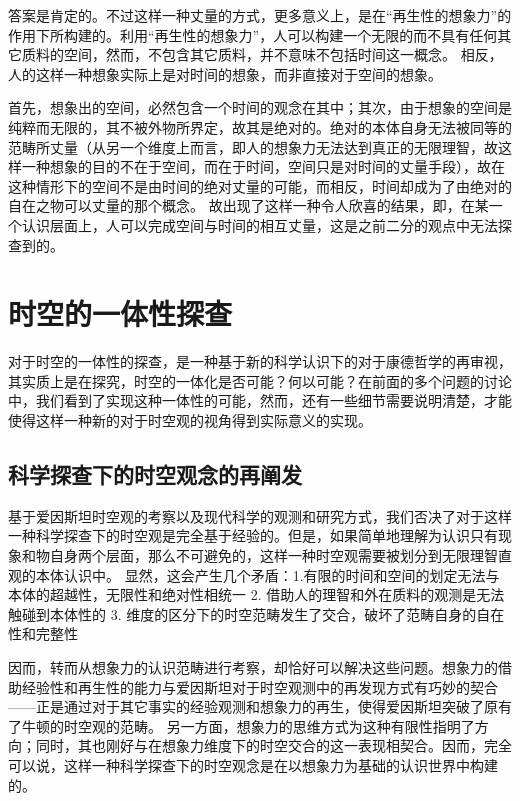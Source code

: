 \documentclass[lang=cn,11pt]{elegantpaper}
\begin{document}
答案是肯定的。不过这样一种丈量的方式，更多意义上，是在“再生性的想象力”的作用下所构建的。利用“再生性的想象力”，人可以构建一个无限的而不具有任何其它质料的空间，然而，不包含其它质料，并不意味不包括时间这一概念。
相反，人的这样一种想象实际上是对时间的想象，而非直接对于空间的想象。

首先，想象出的空间，必然包含一个时间的观念在其中；其次，由于想象的空间是纯粹而无限的，其不被外物所界定，故其是绝对的。绝对的本体自身无法被同等的范畴所丈量（从另一个维度上而言，即人的想象力无法达到真正的无限理智，故这样一种想象的目的不在于空间，而在于时间，空间只是对时间的丈量手段），故在这种情形下的空间不是由时间的绝对丈量的可能，而相反，时间却成为了由绝对的自在之物可以丈量的那个概念。
故出现了这样一种令人欣喜的结果，即，在某一个认识层面上，人可以完成空间与时间的相互丈量，这是之前二分的观点中无法探查到的。
\section{时空的一体性探查}
对于时空的一体性的探查，是一种基于新的科学认识下的对于康德哲学的再审视，其实质上是在探究，时空的一体化是否可能？何以可能？在前面的多个问题的讨论中，我们看到了实现这种一体性的可能，然而，还有一些细节需要说明清楚，才能使得这样一种新的对于时空观的视角得到实际意义的实现。
\subsection{科学探查下的时空观念的再阐发}
基于爱因斯坦时空观的考察以及现代科学的观测和研究方式，我们否决了对于这样一种科学探查下的时空观是完全基于经验的。但是，如果简单地理解为认识只有现象和物自身两个层面，那么不可避免的，这样一种时空观需要被划分到无限理智直观的本体认识中。
显然，这会产生几个矛盾：1.有限的时间和空间的划定无法与本体的超越性，无限性和绝对性相统一  2. 借助人的理智和外在质料的观测是无法触碰到本体性的 3. 维度的区分下的时空范畴发生了交合，破坏了范畴自身的自在性和完整性

因而，转而从想象力的认识范畴进行考察，却恰好可以解决这些问题。想象力的借助经验性和再生性的能力与爱因斯坦对于时空观测中的再发现方式有巧妙的契合——正是通过对于其它事实的经验观测和想象力的再生，使得爱因斯坦突破了原有了牛顿的时空观的范畴。
另一方面，想象力的思维方式为这种有限性指明了方向；同时，其也刚好与在想象力维度下的时空交合的这一表现相契合。因而，完全可以说，这样一种科学探查下的时空观念是在以想象力为基础的认识世界中构建的。
\end{document}

